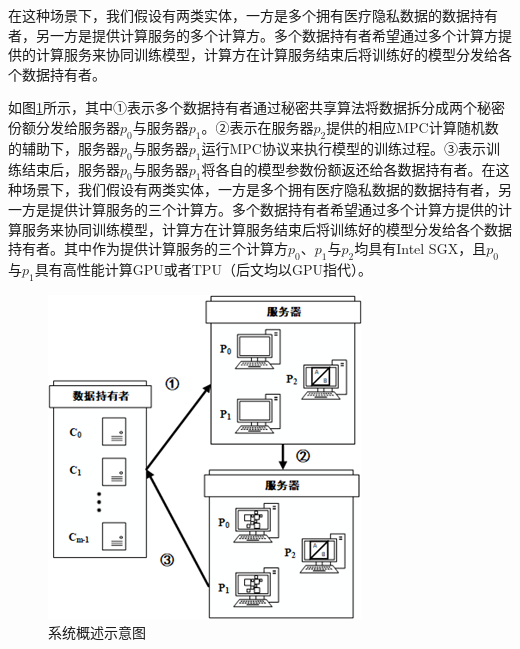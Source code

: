 在这种场景下，我们假设有两类实体，一方是多个拥有医疗隐私数据的数据持有者，另一方是提供计算服务的多个计算方。多个数据持有者希望通过多个计算方提供的计算服务来协同训练模型，计算方在计算服务结束后将训练好的模型分发给各个数据持有者。


如图\ref{Chap4_System_Info}所示，其中①表示多个数据持有者通过秘密共享算法将数据拆分成两个秘密份额分发给服务器$p_0$与服务器$p_1$。②表示在服务器$p_2$提供的相应MPC计算随机数的辅助下，服务器$p_0$与服务器$p_1$运行MPC协议来执行模型的训练过程。③表示训练结束后，服务器$p_0$与服务器$p_1$将各自的模型参数份额返还给各数据持有者。在这种场景下，我们假设有两类实体，一方是多个拥有医疗隐私数据的数据持有者，另一方是提供计算服务的三个计算方。多个数据持有者希望通过多个计算方提供的计算服务来协同训练模型，计算方在计算服务结束后将训练好的模型分发给各个数据持有者。其中作为提供计算服务的三个计算方$p_0$、$p_1$与$p_2$均具有Intel SGX，且$p_0$与$p_1$具有高性能计算GPU或者TPU（后文均以GPU指代）。

\begin{figure}[h]
	\centering
	\includegraphics[width=0.5\linewidth]{figures/Chap4_System_Info.png}
	\caption{系统概述示意图}
	\label{Chap4_System_Info}
\end{figure}

